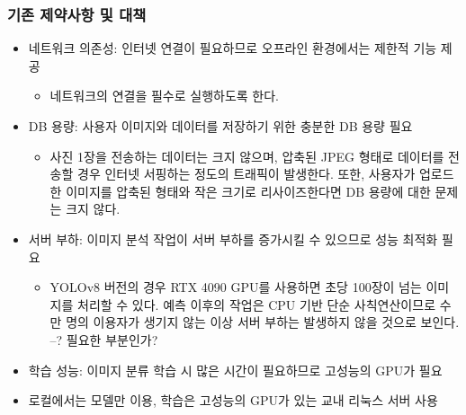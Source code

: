 \documentclass[10pt, a4paper]{article}
\theoremstyle{definition}
\begin{document}
    \subsubsection{기존 제약사항 및 대책}
    \begin{itemize}
        \item 네트워크 의존성: 인터넷 연결이 필요하므로 오프라인 환경에서는 제한적 기능 제공
        \begin{itemize}
            \item 네트워크의 연결을 필수로 실행하도록 한다.
        \end{itemize}
        \item DB 용량: 사용자 이미지와 데이터를 저장하기 위한 충분한 DB 용량 필요
        \begin{itemize}
            \item 사진 1장을 전송하는 데이터는 크지 않으며, 압축된 JPEG 형태로 데이터를 전송할 경우 인터넷 서핑하는 정도의 트래픽이 발생한다. 또한, 사용자가 업로드한 이미지를 압축된 형태와 작은 크기로 리사이즈한다면 DB 용량에 대한 문제는 크지 않다.
        \end{itemize}
        \item 서버 부하: 이미지 분석 작업이 서버 부하를 증가시킬 수 있으므로 성능 최적화 필요
        \begin{itemize}
            \item YOLOv8 버전의 경우 RTX 4090 GPU를 사용하면 초당 100장이 넘는 이미지를 처리할 수 있다. 예측 이후의 작업은 CPU 기반 단순 사칙연산이므로 수만 명의 이용자가 생기지 않는 이상 서버 부하는 발생하지 않을 것으로 보인다. --? 필요한 부분인가?
        \end{itemize}
        \item 학습 성능: 이미지 분류 학습 시 많은 시간이 필요하므로 고성능의 GPU가 필요
    \end{itemize}
    \begin{itemize}
        \item 로컬에서는 모델만 이용, 학습은 고성능의 GPU가 있는 교내 리눅스 서버 사용
    \end{itemize}
\end{document}
